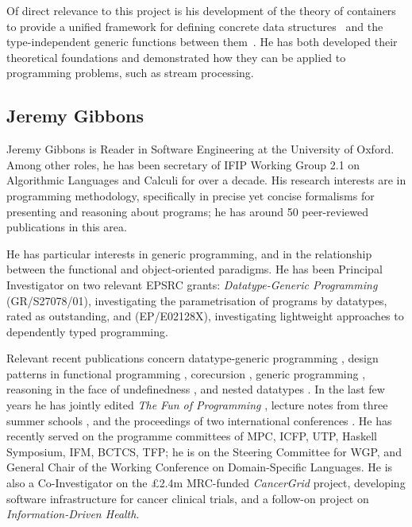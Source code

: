 \documentclass[a4paper]{article}
\begin{document}
Of direct relevance to this project is his development of the theory
of containers to provide a unified framework for defining concrete
data structures~\cite{alti:fossacs03,alti:tlca03,alti:icalp04,alti:jpartial,alti:mpc04,alti:cont-tcs}
and the type-independent generic functions between them~\cite{alti:cats07,alti:jcats07}.  He has both developed their
theoretical foundations and demonstrated how they can be applied
to programming problems, such as stream processing.

\subsection*{Jeremy Gibbons}

Jeremy Gibbons is Reader in Software Engineering at the University of
Oxford. Among other roles, he has been secretary of IFIP Working Group
2.1 on Algorithmic Languages and Calculi for over a decade.  His
research interests are in programming methodology, specifically in
precise yet concise formalisms for presenting and reasoning about
programs; he has around 50 peer-reviewed publications in this area.

He has particular interests in generic programming, and in the
relationship between the functional and object-oriented paradigms. He
has been Principal Investigator on two relevant EPSRC grants:
\textit{Datatype-Generic Programming} (GR/S27078/01), investigating
the parametrisation of programs by datatypes, rated as outstanding,
and (EP/E02128X), investigating lightweight approaches to dependently
typed programming.

{ Relevant recent publications concern datatype-generic
  programming
  \cite{Gibbons2005:DesignECOOP,Gibbons2005:DesignOOPSLA,Gibbons2006:Design,Gibbons2007:Datatype},
  design patterns in functional programming
  \cite{Gibbons&Oliveira2008:Essence,Gibbons2006:Fission,Gibbons2005:Metamorphisms,Gibbons2003:Origami},
  corecursion
  \cite{Gibbons2008:Unfolding,Gibbons*2006:Enumerating,Gibbons2006:Spigot,Gibbons&Hutton2005:Proof,Bird&Gibbons2003:Arithmetic,Hutton&Gibbons00:Generic,Gibbons*2001:When},
  generic programming
  \cite{Gibbons*2007:Generic,Gibbons2003:Patterns,Gibbons2000:Generic},
  reasoning in the face of undefinedness \cite{Danielsson*2006:Fast},
  and nested datatypes
  \cite{Bird*99:Program,Martin&Gibbons2001:Semantics,Martin*2004:Disciplined}.
  In the last few years he has jointly edited \textit{The Fun of
    Programming} \cite{Gibbons&deMoor2003:Fun}, lecture notes from
  three summer schools
  \cite{Backhouse*2007:Datatype,Backhouse&Gibbons2003:Summer,Backhouse*2002:Algebraic},
  and the proceedings of two international conferences
  \cite{Davies&Gibbons2007:Integrated,Gibbons&Jeuring2003:Generic}.
  He has recently served on the programme committees of MPC, ICFP,
  UTP, Haskell Symposium, IFM, BCTCS, TFP; he is on the Steering
  Committee for WGP, and General Chair of the Working Conference on
  Domain-Specific Languages. He is also a Co-Investigator on the
  \pounds 2.4m MRC-funded \textit{CancerGrid} project, developing
  software infrastructure for cancer clinical trials, and a follow-on
  project on \textit{Information-Driven Health}.
\par}
\end{document}
